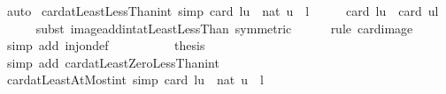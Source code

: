 \begin{isabellebody}
\isamarkupfalse%
\ auto%
\endisatagproof
{\isafoldproof}%
%
\isadelimproof
\isanewline
%
\endisadelimproof
\isanewline
{}\isamarkupfalse%
\ card{\isacharunderscore}{\kern0pt}atLeastLessThan{\isacharunderscore}{\kern0pt}int\ {\isacharbrackleft}{\kern0pt}simp{\isacharbrackright}{\kern0pt}{\isacharcolon}{\kern0pt}\ {\isachardoublequoteopen}card\ {\isacharbraceleft}{\kern0pt}l{\isachardot}{\kern0pt}{\isachardot}{\kern0pt}{\isacharless}{\kern0pt}u{\isacharbraceright}{\kern0pt}\ {\isacharequal}{\kern0pt}\ nat\ {\isacharparenleft}{\kern0pt}u\ {\isacharminus}{\kern0pt}\ l{\isacharparenright}{\kern0pt}{\isachardoublequoteclose}\isanewline
%
\isadelimproof
%
\endisadelimproof
%
\isatagproof
{}\isamarkupfalse%
\ {\isacharminus}{\kern0pt}\isanewline
\ \ \isamarkupfalse%
\ {\isachardoublequoteopen}card\ {\isacharbraceleft}{\kern0pt}l{\isachardot}{\kern0pt}{\isachardot}{\kern0pt}{\isacharless}{\kern0pt}u{\isacharbraceright}{\kern0pt}\ {\isacharequal}{\kern0pt}\ card\ {\isacharbraceleft}{\kern0pt}{}{\isachardot}{\kern0pt}{\isachardot}{\kern0pt}{\isacharless}{\kern0pt}u{\isacharminus}{\kern0pt}l{\isacharbraceright}{\kern0pt}{\isachardoublequoteclose}\isanewline
\ \ \ \ \isamarkupfalse%
\ {\isacharparenleft}{\kern0pt}subst\ image{\isacharunderscore}{\kern0pt}add{\isacharunderscore}{\kern0pt}int{\isacharunderscore}{\kern0pt}atLeastLessThan\ {\isacharbrackleft}{\kern0pt}symmetric{\isacharbrackright}{\kern0pt}{\isacharparenright}{\kern0pt}\isanewline
\ \ \ \ \isamarkupfalse%
\ {\isacharparenleft}{\kern0pt}rule\ card{\isacharunderscore}{\kern0pt}image{\isacharparenright}{\kern0pt}\isanewline
\ \ \ \ \isamarkupfalse%
\ {\isacharparenleft}{\kern0pt}simp\ add{\isacharcolon}{\kern0pt}\ inj{\isacharunderscore}{\kern0pt}on{\isacharunderscore}{\kern0pt}def{\isacharparenright}{\kern0pt}\isanewline
\ \ \ \ \isamarkupfalse%
\isanewline
\ \ \isamarkupfalse%
\ \isamarkupfalse%
\ {\isacharquery}{\kern0pt}thesis\isanewline
\ \ \ \ \isamarkupfalse%
\ {\isacharparenleft}{\kern0pt}simp\ add{\isacharcolon}{\kern0pt}\ card{\isacharunderscore}{\kern0pt}atLeastZeroLessThan{\isacharunderscore}{\kern0pt}int{\isacharparenright}{\kern0pt}\isanewline
{}\isamarkupfalse%
%
\endisatagproof
{\isafoldproof}%
%
\isadelimproof
\isanewline
%
\endisadelimproof
\isanewline
{}\isamarkupfalse%
\ card{\isacharunderscore}{\kern0pt}atLeastAtMost{\isacharunderscore}{\kern0pt}int\ {\isacharbrackleft}{\kern0pt}simp{\isacharbrackright}{\kern0pt}{\isacharcolon}{\kern0pt}\ {\isachardoublequoteopen}card\ {\isacharbraceleft}{\kern0pt}l{\isachardot}{\kern0pt}{\isachardot}{\kern0pt}u{\isacharbraceright}{\kern0pt}\ {\isacharequal}{\kern0pt}\ nat\ {\isacharparenleft}{\kern0pt}u\ {\isacharminus}{\kern0pt}\ l\ {\isacharplus}{\kern0pt}\ {}{\isacharparenright}{\kern0pt}{\isachardoublequoteclose}\isanewline

\end{isabellebody}
